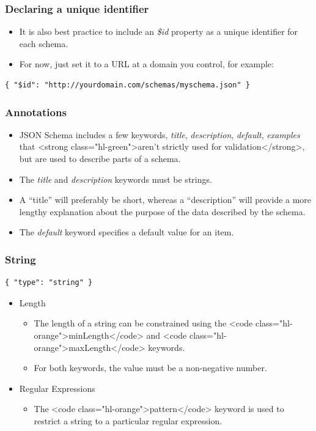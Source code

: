 \documentclass{efd-lecture}
\begin{document}
\begin{frame}[fragile]
  \frametitle{Declaring a unique identifier}
  \begin{itemize}
    \item It is also best practice to include an
      \textit{\color{YellowOrange} \$id} property as a unique identifier for
      each schema.
    \item For now, just set it to a URL at a domain you control, for example:
  \end{itemize}
  \begin{verbatim}
{ "$id": "http://yourdomain.com/schemas/myschema.json" }
  \end{verbatim}
\end{frame}

\begin{frame}
  \frametitle{Annotations}
  \begin{itemize}
    \item JSON Schema includes a few keywords,
      \textit{\color{YellowOrange}title},
      \textit{\color{YellowOrange}description},
      \textit{\color{YellowOrange}default},
      \textit{\color{YellowOrange}examples} that
        <strong class="hl-green">aren’t strictly used for validation</strong>,
        but are used to describe parts of a schema.
    \item The \textit{\color{Yellow}title} and
      \textit{\color{Yellow}description} keywords must be strings.
    \item A ``title'' will preferably be short, whereas a ``description'' will provide
      a more lengthy explanation about the purpose of the data described by
      the schema.
    \item The \textit{\color{Cyan}default} keyword specifies a default
      value for an item.
  \end{itemize}
\end{frame}

\begin{frame}[fragile]
  \frametitle{String}
  \begin{verbatim}
{ "type": "string" }
  \end{verbatim}
  \begin{itemize}
    \item Length
    \begin{itemize}
      \item
          The length of a string can be constrained using the
          <code class="hl-orange">minLength</code> and
          <code class="hl-orange">maxLength</code> keywords.
      \item For both keywords, the value must be a non-negative number.
    \end{itemize}
    \item Regular Expressions
    \begin{itemize}
      \item The <code class="hl-orange">pattern</code> keyword is used to restrict
          a string to a particular regular expression.
    \end{itemize}
  \end{itemize}
\end{frame}
\end{document}
